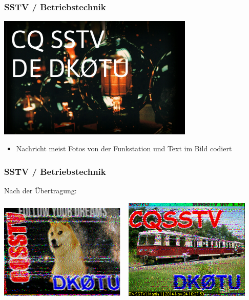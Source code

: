 \begin{frame}
    \frametitle{SSTV / Betriebstechnik}

    \begin{center}
        \includegraphics[width=0.7\textwidth,height=.7\textheight,keepaspectratio]{e16/Transmittingtubes.jpg}
    \end{center}


    \begin{itemize}
        \item Nachricht meist Fotos von der Funkstation und Text im Bild codiert
    \end{itemize}

\end{frame}

\begin{frame}
    \frametitle{SSTV / Betriebstechnik}

    Nach der Übertragung:

    \begin{center}
        \includegraphics[width=0.45\textwidth,height=.45\textheight,keepaspectratio]{e16/sstv_cq.png}
        ~
        \includegraphics[width=0.45\textwidth,height=.45\textheight,keepaspectratio]{e16/sstv_cq_201411241627.png}
    \end{center}

\end{frame}

